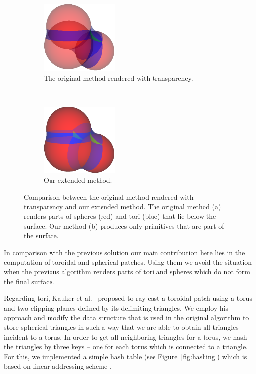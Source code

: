 \begin{figure}[htp]
  \centering
  \begin{subfigure}[t]{0.25\textwidth}
    \centering
    \includegraphics[width=1.5in]{image/cb-krone.png}
    \caption{The original method \cite{krone2011parallel} rendered with transparency.}
		\label{fig:cb-krone}
  \end{subfigure}%
  ~ 
  \begin{subfigure}[t]{0.25\textwidth}
    \centering
    \includegraphics[width=1.5in]{image/cb-oit.png}
    \caption{Our extended method.}
  \end{subfigure}
\caption{Comparison between the original method rendered with transparency and our extended method.
The original method (a) renders parts of spheres (red) and tori (blue) that lie below the surface.
Our method (b) produces only primitives that are part of the surface.
}
\end{figure}

In comparison with the previous solution our main contribution here lies in the computation of toroidal and spherical patches.
Using them we avoid the situation when the previous algorithm renders parts of tori and spheres which do not form the final surface.

Regarding tori, Kauker et al.~\cite{kauker2013rendering} proposed to ray-cast a toroidal patch using a torus and two clipping planes defined by its delimiting triangles.
We employ his approach and modify the data structure that is used in the original algorithm to store spherical triangles in such a way that we are able to obtain all triangles incident to a torus.
In order to get all neighboring triangles for a torus, we hash the triangles by three keys -- one for each torus which is connected to a triangle.
For this, we implemented a simple hash table (see Figure~\ref{fig:hashing}) which is based on linear addressing scheme \cite{alcantara2011efficient}.

